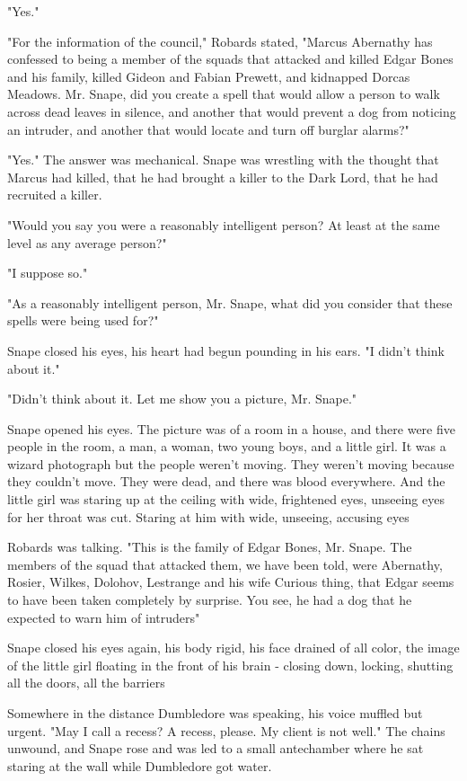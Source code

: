 "Yes."

"For the information of the council," Robards stated, "Marcus Abernathy has confessed to being a member of the squads that attacked and killed Edgar Bones and his family, killed Gideon and Fabian Prewett, and kidnapped Dorcas Meadows. Mr. Snape, did you create a spell that would allow a person to walk across dead leaves in silence, and another that would prevent a dog from noticing an intruder, and another that would locate and turn off burglar alarms?"

"Yes." The answer was mechanical. Snape was wrestling with the thought that Marcus had killed, that he had brought a killer to the Dark Lord, that he had recruited a killer.

"Would you say you were a reasonably intelligent person? At least at the same level as any average person?"

"I suppose so."

"As a reasonably intelligent person, Mr. Snape, what did you consider that these spells were being used for?"

Snape closed his eyes, his heart had begun pounding in his ears. "I{\el} didn't think about it."

"Didn't think about it. Let me show you a picture, Mr. Snape."

Snape opened his eyes. The picture was of a room in a house, and there were five people in the room, a man, a woman, two young boys, and a little girl. It was a wizard photograph but the people weren't moving. They weren't moving because they couldn't move. They were dead, and there was blood everywhere. And the little girl was staring up at the ceiling with wide, frightened eyes, unseeing eyes for her throat was cut. Staring at him with wide, unseeing, accusing eyes{\el}

Robards was talking. "This is the family of Edgar Bones, Mr. Snape. The members of the squad that attacked them, we have been told, were Abernathy, Rosier, Wilkes, Dolohov, Lestrange and his wife{\el} Curious thing, that Edgar seems to have been taken completely by surprise. You see, he had a dog that he expected to warn him of intruders{\el}"

Snape closed his eyes again, his body rigid, his face drained of all color, the image of the little girl floating in the front of his brain - closing down, locking, shutting all the doors, all the barriers{\el}

Somewhere in the distance Dumbledore was speaking, his voice muffled but urgent. "May I call a recess? A recess, please. My client is not well." The chains unwound, and Snape rose and was led to a small antechamber where he sat staring at the wall while Dumbledore got water.

